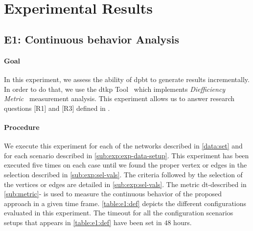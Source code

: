 \section{Experimental Results}\label{sec:exp:observed-results}
\subsection{E1: Continuous behavior Analysis}\label{sub:sec:exp-1} 
\paragraph{Goal} In this experiment, we assess the ability of \acrshort{dpbt} to generate results incrementally.
In order to do that, we use the \acrfull{dtkp} Tool~\cite{diefpy} which implements \emph{Diefficiency Metric}~\cite{diefpaper} measurement analysis.
This experiment allows us to answer research questions [R1] and [R3] defined in . 

\paragraph{Procedure} We execute this experiment for each of the networks described in \autoref{data:set} and for each scenario described in \autoref{sub:exp:exp-data-setup}.
This experiment has been executed five times on each case until we found the proper vertex or edges in the selection described in \autoref{sub:exp:sel-vals}. The criteria followed by the selection of the vertices or edges are detailed in \autoref{sub:exp:sel-vals}.
The metric  \acrfull{dt}-described in \autoref{sub:metric}- is used to measure the continuous behavior of the proposed approach in a given time frame.
\autoref{table:e1:def} depicts the different configurations evaluated in this experiment. The timeout for all the configuration scenarios setups that appears in \autoref{table:e1:def} have been set in $48$ hours.

